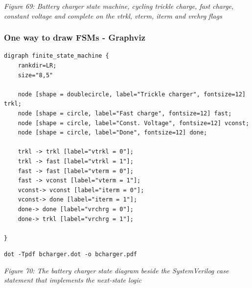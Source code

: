 {
\centering
{}
}

\emph{Figure 69: Battery charger state machine, cycling trickle charge,
fast charge, constant voltage and complete on the vtrkl, vterm, iterm
and vrchrg flags}

\subsubsection{One way to draw FSMs -
Graphviz}\label{one-way-to-draw-fsms---graphviz}

\begin{verbatim}
digraph finite_state_machine {
    rankdir=LR;
    size="8,5"

    node [shape = doublecircle, label="Trickle charger", fontsize=12] trkl;
    node [shape = circle, label="Fast charge", fontsize=12] fast;
    node [shape = circle, label="Const. Voltage", fontsize=12] vconst;
    node [shape = circle, label="Done", fontsize=12] done;

    trkl -> trkl [label="vtrkl = 0"];
    trkl -> fast [label="vtrkl = 1"];
    fast -> fast [label="vterm = 0"];
    fast -> vconst [label="vterm = 1"];
    vconst-> vconst [label="iterm = 0"];
    vconst-> done [label="iterm = 1"];
    done-> done [label="vrchrg = 0"];
    done-> trkl [label="vrchrg = 1"];

}
\end{verbatim}

\begin{verbatim}
dot -Tpdf bcharger.dot -o bcharger.pdf
\end{verbatim}


{
\centering
{}
}

\emph{Figure 70: The battery charger state diagram beside the
SystemVerilog case statement that implements the next-state logic}

